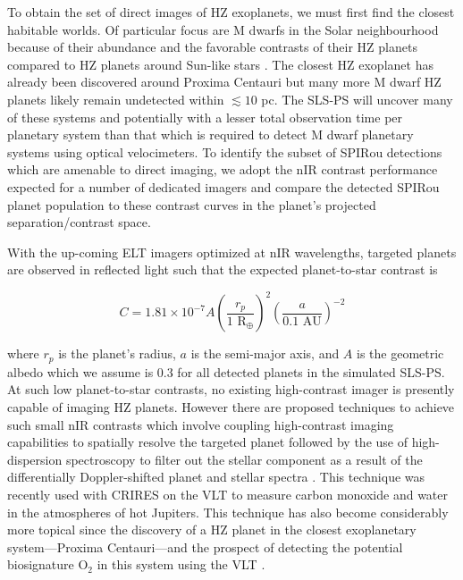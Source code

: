 To obtain the set of direct images of HZ exoplanets, we must first find the closest habitable
worlds. Of particular focus are M dwarfs in the Solar neighbourhood because of their abundance and the
favorable contrasts of their HZ planets compared to HZ planets around Sun-like stars \citep{crossfield13}. 
The closest HZ exoplanet has already been discovered around Proxima Centauri
\citep[1.3 pc;][]{angladaescude16} but many more M dwarf HZ planets likely remain undetected
within $\lesssim 10$ pc. The SLS-PS will uncover many of these systems and potentially with a lesser total
observation time per planetary system than that which is required to detect M dwarf planetary systems
using optical velocimeters. To identify the subset of SPIRou
detections which are amenable to direct imaging, we adopt the nIR contrast performance expected for
a number of dedicated imagers and compare the detected SPIRou planet population to these contrast curves
in the planet's projected separation/contrast space.

With the up-coming ELT imagers optimized at nIR wavelengths, targeted planets are observed in
reflected light such that the expected planet-to-star contrast is

\begin{equation}
  C = 1.81 \times 10^{-7} A \left( \frac{r_p}{1\text{ R}_{\oplus}} \right)^2
  \left( \frac{a}{0.1\text{ AU}} \right)^{-2}
\end{equation}

\noindent where $r_p$ is the planet's radius, $a$ is the semi-major axis, and
$A$ is the geometric albedo which we assume is 0.3 for all
detected planets in the simulated SLS-PS. At such low planet-to-star contrasts, no existing
high-contrast imager is presently capable of imaging HZ planets. However there are
proposed techniques to achieve such small nIR contrasts which involve
coupling high-contrast imaging capabilities to spatially resolve the targeted planet followed
by the use of 
high-dispersion spectroscopy to filter out the stellar component as a result of the differentially
Doppler-shifted planet and stellar spectra \citep[e.g.][]{snellen15, lovis17}. This technique was
recently used with CRIRES on the VLT to measure carbon monoxide \citep{snellen10, brogi12, dekok13}
and water \citep{birkby13} in the atmospheres of hot Jupiters. This technique has also
become considerably more topical since the discovery of a HZ planet in the closest exoplanetary
system---Proxima Centauri---and the prospect of detecting the potential biosignature O$_2$ in this
system using the VLT \citep{lovis17}.

